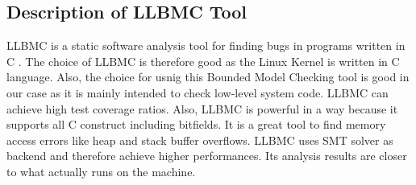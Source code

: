 \subsection{Description of LLBMC Tool}
LLBMC is a static software analysis tool for finding bugs in programs written in C \cite{llbmc}.
The choice of LLBMC is therefore good as the Linux Kernel is written in C language.
Also, the choice for usnig this Bounded Model Checking tool is good in our case as it is 
mainly intended to check low-level system code.
LLBMC can achieve high test coverage ratios.
Also, LLBMC is powerful in a way because it supports all C construct including bitfields.
It is a great tool to find memory access errors like heap and stack buffer overflows.
LLBMC uses SMT solver as backend and therefore achieve higher performances.
Its analysis results are closer to what actually runs on the machine.

